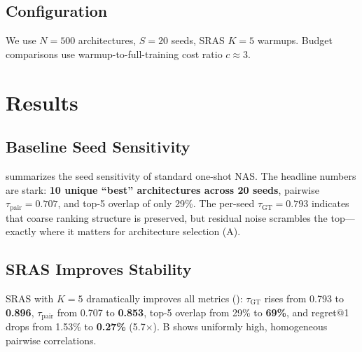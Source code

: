 \documentclass[10pt,twocolumn,letterpaper]{article}
\newcommand{\method}{SRAS}
\newcommand{\taugt}{\ensuremath{\tau_{\text{GT}}}}
\newcommand{\taupair}{\ensuremath{\tau_{\text{pair}}}}
\begin{document}
\subsection{Configuration}
We use $N = 500$ architectures, $S = 20$ seeds, \method{} $K = 5$ warmups. Budget comparisons use warmup-to-full-training cost ratio $c \approx 3$.

\section{Results}
\label{sec:results}

\subsection{Baseline Seed Sensitivity}
\label{sec:exp1}

 summarizes the seed sensitivity of standard one-shot NAS. The headline numbers are stark: \textbf{10 unique ``best'' architectures across 20 seeds}, pairwise $\taupair = 0.707$, and top-5 overlap of only 29\%. The per-seed $\taugt = 0.793$ indicates that coarse ranking structure is preserved, but residual noise scrambles the top---exactly where it matters for architecture selection (A).

\subsection{\method{} Improves Stability}
\label{sec:exp2}

\method{} with $K=5$ dramatically improves all metrics (): $\taugt$ rises from 0.793 to \textbf{0.896}, $\taupair$ from 0.707 to \textbf{0.853}, top-5 overlap from 29\% to \textbf{69\%}, and regret@1 drops from 1.53\% to \textbf{0.27\%} (5.7$\times$). B shows uniformly high, homogeneous pairwise correlations.
\end{document}
